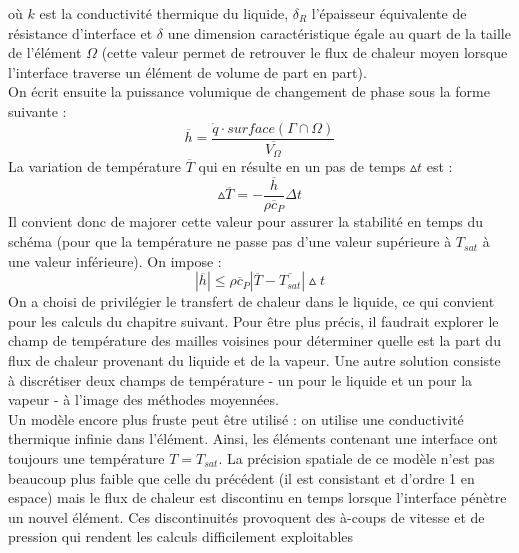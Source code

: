 o\`u $k$ est la conductivit\'e thermique du liquide, $\delta_{R}$ l'\'epaisseur \'equivalente de r\'esistance d'interface et $\delta$ une dimension caract\'eristique \'egale au quart de la taille de l'\'el\'ement $\Omega$ (cette valeur permet de retrouver le flux de chaleur moyen lorsque l'interface traverse un \'el\'ement de volume de part en part).\\
On \'ecrit ensuite la puissance volumique de changement de phase sous la forme
suivante :
\begin{equation}
\overline{h} \hat{=} \dfrac{\dot{q} \cdot surface(\Gamma \cap \Omega)}{\overline{V_{\Omega}}}
\end{equation}
La variation de temp\'erature $\overline{T}$ qui en r\'esulte en un pas de temps $\vartriangle t$ est :
\begin{equation}
\vartriangle \overline{T} = - \dfrac{\overline{h}}{\overline{\rho c_{P}}} \Delta t
\end{equation}
Il convient donc de majorer cette valeur pour assurer la stabilit\'e en temps du sch\'ema (pour que la temp\'erature ne passe pas d'une valeur sup\'erieure \`a $T_{sat}$ \`a une valeur inf\'erieure). On impose :
\begin{equation}
|\overline{h}| \leq \overline{\rho c_{P}} | \overline{T} - \overline{T_{sat}}| \vartriangle t
\end{equation}
On a choisi de privil\'egier le transfert de chaleur dans le liquide, ce qui convient pour les calculs du chapitre suivant. Pour \^etre plus pr\'ecis, il faudrait explorer le champ de temp\'erature des mailles voisines pour d\'eterminer quelle est la part du flux de chaleur provenant du liquide et de la vapeur. Une autre solution consiste \`a discr\'etiser deux champs de temp\'erature - un pour le liquide et un pour la vapeur - \`a l'image des m\'ethodes moyenn\'ees.\\
Un mod\`ele encore plus fruste peut \^etre utilis\'e : on utilise une conductivit\'e thermique infinie dans l'\'el\'ement. Ainsi, les \'el\'ements contenant une interface ont toujours une temp\'erature $T = T_{sat}$. La pr\'ecision spatiale de ce mod\`ele n'est pas beaucoup plus faible que celle du pr\'ec\'edent (il est consistant et d'ordre 1 en espace) mais le flux de chaleur est discontinu en temps lorsque l'interface p\'enètre un nouvel \'el\'ement. Ces discontinuit\'es provoquent des \`a-coups de vitesse et de pression qui rendent les calculs difficilement exploitables
\smallskip \\

